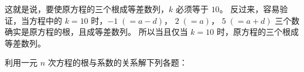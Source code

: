 这就是说，要使原方程的三个根成等差数列，$k$ 必须等于 $10$。
反过来，容易验证，当方程中的 $k = 10$ 时，$-1 \; (= a - d)$，
$2 \; (= a)$， $5 \; (= a + d)$ 三个数确实是原方程的根，且成等差数列。
所以当且仅当 $k = 10$ 时，原方程的三个根成等差数列。

\lianxi

利用一元 $n$ 次方程的根与系数的关系解下列各题：

\begin{xiaotis}





\end{xiaotis}

